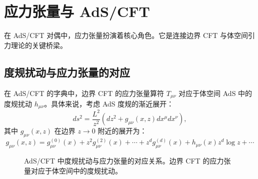 \section{应力张量与 AdS/CFT}

在 AdS/CFT 对偶中，应力张量扮演着核心角色。它是连接边界 CFT 与体空间引力理论的关键桥梁\cite{Balasubramanian1999}。

\subsection{度规扰动与应力张量的对应}

在 AdS/CFT 的字典中，边界 CFT 的应力张量算符 $T_{\mu\nu}$ 对应于体空间 AdS 中的度规扰动 $h_{\mu\nu}$。具体来说，考虑 AdS 度规的渐近展开：
\begin{equation}
    ds^2 = \frac{L^2}{z^2} \left(dz^2 + g_{\mu\nu}(x, z) dx^\mu dx^\nu\right),
\end{equation}
其中 $g_{\mu\nu}(x, z)$ 在边界 $z \to 0$ 附近的展开为\cite{deHaro2000}：
\begin{equation}
    g_{\mu\nu}(x, z) = g_{\mu\nu}^{(0)}(x) + z^2 g_{\mu\nu}^{(2)}(x) + \cdots + z^d g_{\mu\nu}^{(d)}(x) + h_{\mu\nu}(x) z^d \log z + \cdots
\end{equation}

\begin{figure}[htbp]
\centering
{}
\caption{AdS/CFT 中度规扰动与应力张量的对应关系。边界 CFT 的应力张量对应于体空间中的度规扰动。}
\label{fig:holographic_stress}
\end{figure}

